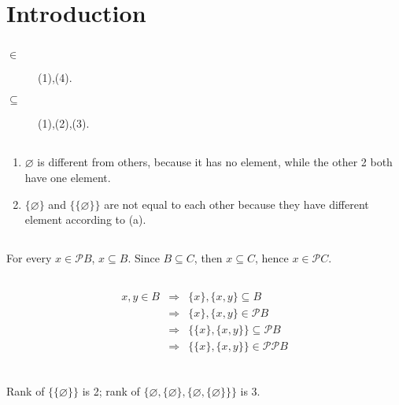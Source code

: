 \chapter{Introduction}

\section{}
\begin{description}
  \item[$\in$] (1),(4).
  \item[$\subseteq$] (1),(2),(3).
\end{description}


\section{}
\begin{enumerate}
  \item $\varnothing$ is different from others, because it has no element,
        while the other 2 both have one element.
  \item $\{\varnothing\}$ and $\{\{\varnothing\}\}$ are not equal to each
        other because they have different element according to (a).
\end{enumerate}


\section{}
For every $ x \in \mathscr{P}B $, $ x \subseteq B $. Since $ B \subseteq C $,
then $ x \subseteq C $, hence $ x \in \mathscr{P}C $.


\section{}
\begin{displaymath}
\begin{array}{rcl}
  x, y \in B
  & \Rightarrow & \{x\}, \{x,y\} \subseteq B \\
  & \Rightarrow & \{x\}, \{x,y\} \in \mathscr{P}B \\
  & \Rightarrow & \{\{x\}, \{x,y\} \} \subseteq \mathscr{P}B \\
  & \Rightarrow & \{\{x\}, \{x,y\} \} \in \mathscr{PP}B \\
\end{array}
\end{displaymath}


\section{}
Rank of $ \{\{\varnothing\}\} $ is 2; rank of $ \{ \varnothing, \{ \varnothing \}, 
\{ \varnothing, \{ \varnothing \} \} \} $ is 3.


